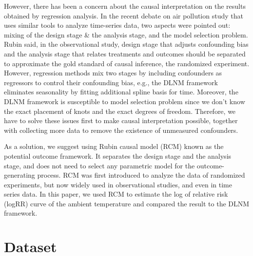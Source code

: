 \documentclass[12pt]{article}
\begin{document}
However, there has been a concern about the causal interpretation 
on the results obtained by regression analysis.
In the recent debate on air pollution study\cite{dominici2019sci} 
that uses similar tools to analyze time-series data,
two aspects were pointed out:
mixing of the design stage \& the analysis stage, and the model selection problem.
Rubin said, in the observational study,
design stage that adjusts confounding bias and the analysis stage that relates treatments and outcomes
should be separated to approximate the gold standard of causal inference, 
the randomized experiment\cite{rubin2007sim}.
However, regression methods mix two stages
by including confounders as regressors to control their confounding bias,
e.g., the DLNM framework eliminates seasonality by fitting additional spline basis for time.
Moreover, the DLNM framework is susceptible to model selection problem\cite{gasparrini2016}
since we don't know the exact placement of knots and the exact degrees of freedom.
Therefore, we have to solve these issues first to make causal interpretation possible,
together with collecting more data to remove the existence of unmeasured confounders.

As a solution, we suggest using Rubin causal model (RCM)\cite{holland1986}
known as the potential outcome framework.
It separates the design stage and the analysis stage,
and does not need to select any parametric model for the outcome-generating process.
RCM was first introduced 
to analyze the data of randomized experiments\cite{rubin1974},
but now widely used in observational studies\cite{wu2020sciadv},
and even in time series data\cite{angrist2018}.
In this paper, 
we used RCM to estimate the log of relative risk (logRR) curve of the ambient temperature 
and compared the result to the DLNM framework.

\section{Dataset}
\label{section:data}
\end{document}
